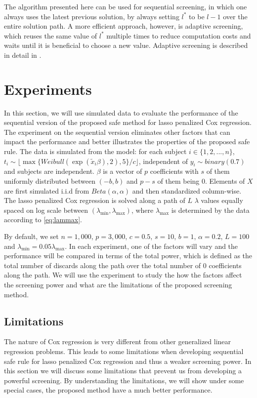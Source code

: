 The algorithm presented here can be used for sequential screening, in which one always uses the latest previous solution, by always setting $l^*$ to be $l-1$ over the entire solution path. A more efficient approach, however, is adaptive screening, which reuses the same value of $l^*$ multiple times to reduce computation costs and waits until it is beneficial to choose a new value. Adaptive screening is described in detail in \citep{wang2021adaptive}.

\section{Experiments}

In this section, we will use simulated data to evaluate the performance of the sequential version of the proposed safe method for lasso penalized Cox regression. The experiment on the sequential version eliminates other factors that can impact the performance and better illustrates the properties of the proposed safe rule. The data is simulated from the model: for each subject $i\in\{1,2,...,n\}$, $t_i\sim \lfloor\max\{Weibull(\exp(\tilde{x}_i\beta),2), 5\}/c\rfloor $, independent of $y_i\sim binary(0.7)$ and subjects are independent. $\beta$ is a vector of $p$ coefficients with $s$ of them uniformly distributed between $(-b,b)$ and $p-s$ of them being $0$. Elements of $X$ are first simulated i.i.d from $Beta(\alpha,\alpha)$ and then standardized column-wise. The lasso penalized Cox regression is solved along a path of $L$ $\lambda$ values equally spaced on log scale between $(\lambda_{\min},\lambda_{\max})$, where $\lambda_{\max}$ is determined by the data according to \eqref{eq:lammax}. 

By default, we set $n=1,000$, $p=3,000$, $c=0.5$, $s=10$, $b=1$, $\alpha=0.2$, $L=100$ and $\lambda_{\min}=0.05\lambda_{\max}$. In each experiment, one of the factors will vary and the performance will be compared in terms of the total power, which is defined as the total number of discards along the path over the total number of 0 coefficients along the path. We will use the experiment to study the how the factors affect the screening power and what are the limitations of the proposed screening method.

\subsection{Limitations}
\label{sec:lim}


The nature of Cox regression is very different from other generalized linear regression problems. This leads to some limitations when developing sequential safe rule for lasso penalized Cox regression and thus a weaker screening power. In this section we will discuss some limitations that prevent us from developing a powerful screening. By understanding the limitations, we will show under some special cases, the proposed method have a much better performance.


